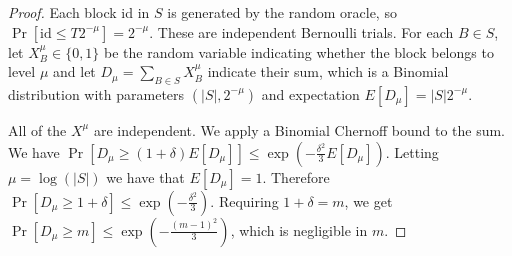 \begin{proof}

    Each block id in $S$ is generated by the random oracle, so $\Pr[\text{id}
    \leq T 2^{-\mu}] = 2^{-\mu}$. These are independent Bernoulli trials. For
    each $B \in S$, let $X^{\mu}_B \in \{0, 1\}$ be the random variable
    indicating whether the block belongs to level $\mu$ and let $D_\mu = \sum_{B
    \in S} X^\mu_B$ indicate their sum, which is a Binomial distribution with
    parameters $(|S|, 2^{-\mu})$ and expectation $E[D_{\mu}] = |S| 2^{-\mu}$.

    All of the $X^{\mu}$ are independent. We apply a Binomial Chernoff
    bound to the sum. We have
    $\Pr[D_\mu \geq (1 + \delta)E[D_\mu]] \leq
    \exp(-\frac{\delta^2}{3}E[D_\mu])$. Letting $\mu = \log(|S|)$ we have that
    $E[D_\mu] = 1$. Therefore $\Pr[D_\mu \geq 1 + \delta] \leq
    \exp(-\frac{\delta^2}{3})$. Requiring $1 + \delta = m$, we get $\Pr[D_\mu
    \geq m] \leq \exp(-\frac{(m - 1)^2}{3})$, which is negligible in $m$.
\end{proof}
